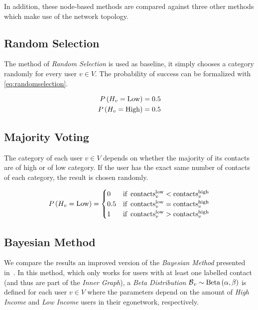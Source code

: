 In addition, these node-based methods are compared against three other methods which make use of the network topology.

\subsection{Random Selection}

The method of \emph{Random Selection} is used as baseline, it simply chooses a category randomly for every user $v \in V$. The probability of success can be formalized with \cref{eq:randomselection}.

\begin{equation}
\label{eq:randomselection}
\begin{aligned}
	P \left( H_v = \operatorname{Low} \right) &= 0.5 \\
	P \left( H_v = \operatorname{High} \right) &= 0.5
\end{aligned}
\end{equation}

\subsection{Majority Voting}

The category of each user $v \in V$ depends on whether the majority of its contacts are of high or of low category. If the user has the exact same number of contacts of each category, the result is chosen randomly.

\begin{equation}
\label{eq:majorityvoting}
	P \left( H_v = \operatorname{Low} \right) =
	\begin{cases}
		0 & \text{if} \ \operatorname{contacts}^{\operatorname{low}}_v < \operatorname{contacts}^{\operatorname{high}}_v \\
		0.5 & \text{if} \ \operatorname{contacts}^{\operatorname{low}}_v = \operatorname{contacts}^{\operatorname{high}}_v \\
		1 & \text{if} \ \operatorname{contacts}^{\operatorname{low}}_v > \operatorname{contacts}^{\operatorname{high}}_v
	\end{cases}
\end{equation}

\subsection{Bayesian Method}

We compare the results an improved version of the \emph{Bayesian Method} presented in~\cite{fixmanasonam2016}. In this method, which only works for users with at least one labelled contact (and thus are part of the \emph{Inner Graph}), a \emph{Beta Distribution} $\operatorname{\mathcal{B}}_v \sim \operatorname{Beta} \left( \alpha, \beta \right)$ is defined for each user $v \in V$ where the parameters depend on the amount of \emph{High Income} and \emph{Low Income} users in their egonetwork, respectively.

